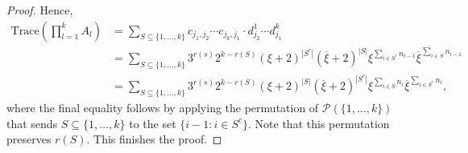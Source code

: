 \documentclass[10pt,a4paper]{amsart}
\newcommand{\Tr}{\mathrm{Trace}}
\begin{document}
\begin{proof}
Hence, 
\begin{align*}
\Tr(\prod_{l=1}^k A_l)&=\sum_{S\subseteq \{1,\hdots,k\}}c_{j_1,j_2}\cdots c_{j_k,j_1}\cdot d_{j_2}^1\cdots d_{j_1}^k\\
&=\sum_{S\subseteq\{1,\hdots,k\}}3^{r(s)}2^{k-r(S)}(\xi+2)^{|S^c|}(\overline\xi+2)^{|S|}\xi^{\sum_{i\in S^c}n_{i-1}}\overline\xi^{\sum_{i\in S}n_{i-1}}\\
&=\sum_{S\subseteq\{1,\hdots,k\}}3^{r(s)}2^{k-r(S)}(\xi+2)^{|S|}(\overline\xi+2)^{|S^c|}\xi^{\sum_{i\in S}n_i}\overline\xi^{\sum_{i\in S^c}n_i},
\end{align*}
where the final equality follows by applying the permutation of $\mathcal{P}(\{1,\hdots,k\})$ that sends $S\subseteq \{1,\hdots,k\}$ to the
set $\{i - 1 : i \in S^c\}$. Note that this permutation preserves $r(S)$. This finishes the proof.
\end{proof}
\end{document}
